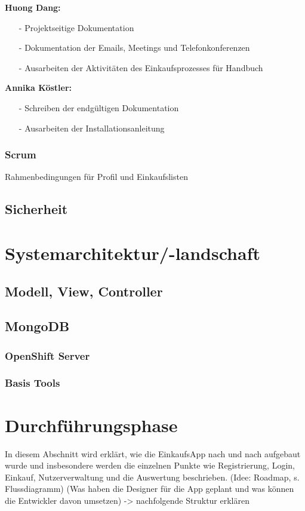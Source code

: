 \documentclass[12pt,a4paper]{article}
\begin{document}
\textbf{Huong Dang:}
\begin{itemize}
\item[-] Projektseitige Dokumentation
\item[-] Dokumentation der Emails, Meetings und Telefonkonferenzen
\item[-] Ausarbeiten der Aktivitäten des Einkaufsprozesses für Handbuch 
\end{itemize}

\textbf{Annika Köstler:}
\begin{itemize}
\item[-] Schreiben der endgültigen Dokumentation
\item[-] Ausarbeiten der Installationsanleitung 
\end{itemize}
\newpage

\subsubsection{Scrum}
Rahmenbedingungen für Profil und Einkaufslisten
\newpage
\subsection{Sicherheit}
\newpage


\section{Systemarchitektur/-landschaft}
\newpage
\subsection{Modell, View, Controller}
\newpage
\subsection{MongoDB}
\newpage
\subsubsection{OpenShift Server}
\newpage
\subsubsection{Basis Tools}
\newpage

\section{Durchführungsphase}
In diesem Abschnitt wird erklärt, wie die EinkaufsApp nach und nach aufgebaut wurde und insbesondere werden die einzelnen Punkte wie Registrierung, Login, Einkauf, Nutzerverwaltung und die Auswertung beschrieben.
(Idee: Roadmap, s. Flussdiagramm) (Was haben die Designer für die App geplant und was können die Entwickler davon umsetzen) -> nachfolgende Struktur erklären
\end{document}
